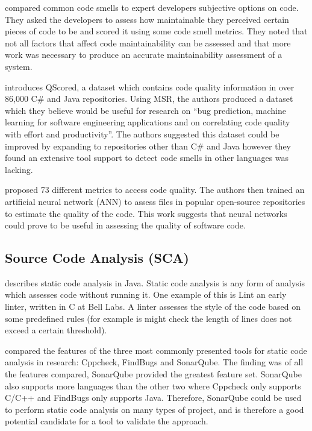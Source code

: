 \cite{6405287} compared common code smells to expert developers subjective options on code.
They asked the developers to assess how maintainable they perceived certain pieces of code to be and scored it using some code smell metrics.
They noted that not all factors that affect code maintainability can be assessed and that more work was necessary to produce an accurate maintainability assessment of a system.

\cite{9463095} introduces QScored, a dataset which contains code quality information in over 86,000 C\# and Java repositories.
Using MSR, the authors produced a dataset which they believe would be useful for research on ``bug prediction, machine learning for software engineering applications and on correlating code quality with effort and productivity''.
The authors suggested this dataset could be improved by expanding to repositories other than C\# and Java however they found an extensive tool support to detect code smells in other languages was lacking.

\cite{7589790} proposed 73 different metrics to access code quality.
The authors then trained an artificial neural network (ANN) to assess files in popular open-source repositories to estimate the quality of the code.
This work suggests that neural networks could prove to be useful in assessing the quality of software code.

\subsection{Source Code Analysis (SCA)}
\label{subsec:source-code-analytics-(sca)}

\cite{1657940} describes static code analysis in Java.
Static code analysis is any form of analysis which assesses code without running it.
One example of this is Lint an early linter, written in C at Bell Labs.
A linter assesses the style of the code based on some predefined rules (for example is might check the length of lines does not exceed a certain threshold).

\cite{sonarqube} compared the features of the three most commonly presented tools for static code analysis in research: Cppcheck, FindBugs and SonarQube.
The finding was of all the features compared, SonarQube provided the greatest feature set.
SonarQube also supports more languages than the other two where Cppcheck only supports C/C++ and FindBugs only supports Java.
Therefore, SonarQube could be used to perform static code analysis on many types of project, and is therefore a good potential candidate for a tool to validate the approach.

